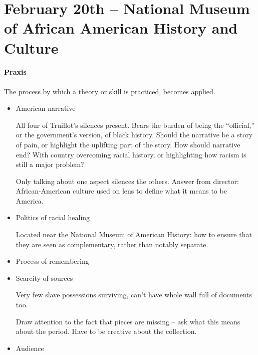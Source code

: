 \section{February 20th -- National Museum of African American History and Culture} 

\paragraph{Praxis} The process by which a theory or skill is practiced, becomes applied.

\begin{itemize}
  \item American narrative

  All four of Truillot's silences present. Bears the burden of being the ``official,'' or the government's version, of black history. Should the narrative be a story of pain, or highlight the uplifting part of the story. How should narrative end? With country overcoming racial history, or highlighting how racism is still a major problem?

  Only talking about one aspect silences the others. Answer from director: African-American culture used on lens to define what it means to be America.

  \item Politics of racial healing

  Located near the National Museum of American History: how to ensure that they are seen as complementary, rather than notably separate.

  \item Process of remembering
  \item Scarcity of sources

  Very few slave possessions surviving, can't have whole wall full of documents too. 

  Draw attention to the fact that pieces are missing -- ask what this means about the period. Have to be creative about the collection.

  \item Audience
\end{itemize}